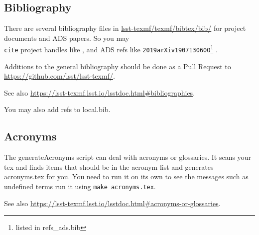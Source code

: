 \subsection{Bibliography}
There are several bibliography files in \url{lsst-texmf/texmf/bibtex/bib/} for project documents and ADS papers.
So you may \texttt{\\cite} project handles like \cite{LSE-61}, \cite{PSTN-017} and ADS refs like \texttt{2019arXiv190713060O}\footnote{listed in refs\_ads.bib} \cite{2019arXiv190713060O}.

Additions to the general bibliography should be done as a Pull Request to \url{https://github.com/lsst/lsst-texmf/}.

See also \url{https://lsst-texmf.lsst.io/lsstdoc.html#bibliographies}.

You may also add refs to local.bib.
\subsection{Acronyms}

The generateAcronyms script can deal with acronyms or glossaries. It scans your tex and finds items that should be in the
acronym list and generates acronyms.tex for you.
You need to run it on its own to see the messages such as undefined terms run it using \texttt{make acronyms.tex}.

See also \url{https://lsst-texmf.lsst.io/lsstdoc.html#acronyms-or-glossaries}.


